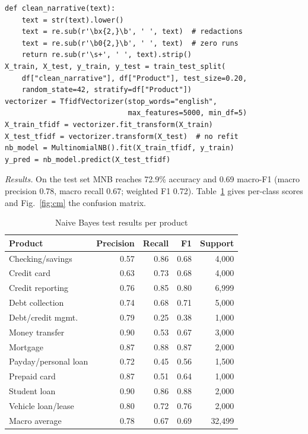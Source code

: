 \documentclass[conference]{IEEEtran}
\begin{document}
\begin{lstlisting}[float=!t, caption={Text cleaning and the naive Bayes baseline (abridged).}, label=lst:nb]
def clean_narrative(text):
    text = str(text).lower()
    text = re.sub(r'\bx{2,}\b', ' ', text)  # redactions
    text = re.sub(r'\b0{2,}\b', ' ', text)  # zero runs
    return re.sub(r'\s+', ' ', text).strip()
X_train, X_test, y_train, y_test = train_test_split(
    df["clean_narrative"], df["Product"], test_size=0.20,
    random_state=42, stratify=df["Product"])
vectorizer = TfidfVectorizer(stop_words="english",
                             max_features=5000, min_df=5)
X_train_tfidf = vectorizer.fit_transform(X_train)
X_test_tfidf = vectorizer.transform(X_test)  # no refit
nb_model = MultinomialNB().fit(X_train_tfidf, y_train)
y_pred = nb_model.predict(X_test_tfidf)
\end{lstlisting}

\textit{Results.} On the test set MNB reaches 72.9\% accuracy and 0.69 macro-F1 (macro precision 0.78, macro recall 0.67; weighted F1 0.72). Table~\ref{tab:nb} gives per-class scores and Fig.~\ref{fig:cm} the confusion matrix.

\begin{table}[!t]
\caption{Naive Bayes test results per product}
\label{tab:nb}
\centering
\footnotesize
\begin{tabular}{@{}lrrrr@{}}
\toprule
Product & Precision & Recall & F1 & Support \\
\midrule
Checking/savings & 0.57 & 0.86 & 0.68 & 4,000 \\
Credit card & 0.63 & 0.73 & 0.68 & 4,000 \\
Credit reporting & 0.76 & 0.85 & 0.80 & 6,999 \\
Debt collection & 0.74 & 0.68 & 0.71 & 5,000 \\
Debt/credit mgmt. & 0.79 & 0.25 & 0.38 & 1,000 \\
Money transfer & 0.90 & 0.53 & 0.67 & 3,000 \\
Mortgage & 0.87 & 0.88 & 0.87 & 2,000 \\
Payday/personal loan & 0.72 & 0.45 & 0.56 & 1,500 \\
Prepaid card & 0.87 & 0.51 & 0.64 & 1,000 \\
Student loan & 0.90 & 0.86 & 0.88 & 2,000 \\
Vehicle loan/lease & 0.80 & 0.72 & 0.76 & 2,000 \\
\midrule
Macro average & 0.78 & 0.67 & 0.69 & 32,499 \\
\bottomrule
\end{tabular}
\end{table}
\end{document}
